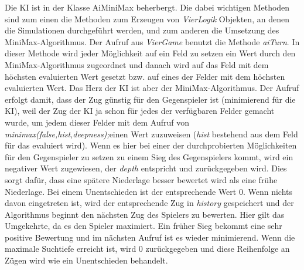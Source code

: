 \documentclass[12pt,a4paper]{article}
\begin{document}
		Die KI ist in der Klasse AiMiniMax beherbergt. Die dabei wichtigen Methoden sind zum einen die Methoden zum Erzeugen von \textit{VierLogik} Objekten, an denen die Simulationen durchgeführt werden, und zum anderen die Umsetzung des MiniMax-Algorithmus. Der Aufruf aus \textit{VierGame} benutzt die Methode \textit{aiTurn}. In dieser Methode wird jeder Möglichkeit auf ein Feld zu setzen ein Wert durch den MiniMax-Algorithmus zugeordnet und danach wird auf das Feld mit dem höchsten evaluierten Wert gesetzt bzw. auf eines der Felder mit dem höchsten evaluierten Wert. Das Herz der KI ist aber der MiniMax-Algorithmus. Der Aufruf erfolgt damit, dass der Zug günstig für den Gegenspieler ist (minimierend für die KI), weil der Zug der KI ja schon für jedes der verfügbaren Felder gemacht wurde, um jedem dieser Felder mit dem Aufruf von \textit{minimax(false,hist,deepness);}einen Wert zuzuweisen (\textit{hist} bestehend aus dem Feld für das evaluiert wird). Wenn es hier bei einer der durchprobierten Möglichkeiten für den Gegenspieler zu setzen zu einem Sieg des Gegenspielers kommt, wird ein negativer Wert zugewiesen, der \textit{depth} entspricht und zurückgegeben wird. Dies sorgt dafür, dass eine spätere Niederlage besser bewertet wird als eine frühe Niederlage. Bei einem Unentschieden ist der entsprechende Wert 0. Wenn nichts davon eingetreten ist, wird der entsprechende Zug in \textit{history} gespeichert und der Algorithmus beginnt den nächsten Zug des Spielers zu bewerten. Hier gilt das Umgekehrte, da es den Spieler maximiert. Ein früher Sieg bekommt eine sehr positive Bewertung	%
	 und im nächsten Aufruf ist es wieder minimierend. Wenn die maximale Suchtiefe erreicht ist, wird 0 zurückgegeben und diese Reihenfolge an Zügen wird wie ein Unentschieden behandelt.
\end{document}
